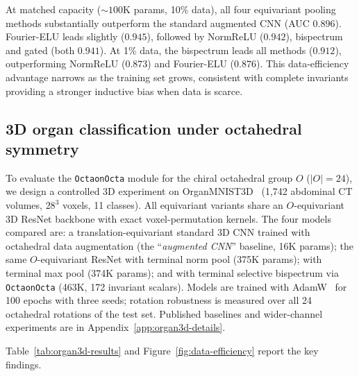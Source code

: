 \documentclass{article}
\theoremstyle{definition}
\theoremstyle{remark}
\theoremstyle{definition}
\begin{document}
At matched capacity (${\sim}100$K params, 10\% data), all four equivariant
pooling methods substantially outperform the standard augmented CNN
(AUC $0.896$). Fourier-ELU leads slightly ($0.945$), followed by
NormReLU ($0.942$), bispectrum and gated (both $0.941$).
At 1\% data, the bispectrum leads all methods ($0.912$), outperforming
NormReLU ($0.873$) and Fourier-ELU ($0.876$). This data-efficiency
advantage narrows as the training set grows, consistent with complete
invariants providing a stronger inductive bias when data is scarce.

\subsection{3D organ classification under octahedral symmetry}
\label{sec:organ3d}

To evaluate the \texttt{OctaonOcta} module for the chiral octahedral group
$O$ ($|O|=24$), we design a controlled 3D experiment on
OrganMNIST3D~\citep{medmnistv2} (1{,}742 abdominal CT volumes, $28^3$
voxels, 11 classes). All equivariant variants share an $O$-equivariant 3D
ResNet backbone with exact voxel-permutation kernels. The four models
compared are: a translation-equivariant standard 3D CNN trained with
octahedral data augmentation (the ``\emph{augmented CNN}'' baseline,
16K params); the same $O$-equivariant ResNet with terminal norm pool
(375K params); with terminal max pool (374K params); and with terminal
selective bispectrum via \texttt{OctaonOcta} (463K, 172 invariant
scalars). Models are trained with AdamW~\citep{loshchilov2019adamw} for
100 epochs with three seeds; rotation robustness is measured over all
24 octahedral rotations of the test set. Published baselines and
wider-channel experiments are in Appendix~\ref{app:organ3d-details}.

Table~\ref{tab:organ3d-results} and
Figure~\ref{fig:data-efficiency} report the key findings.
\end{document}
